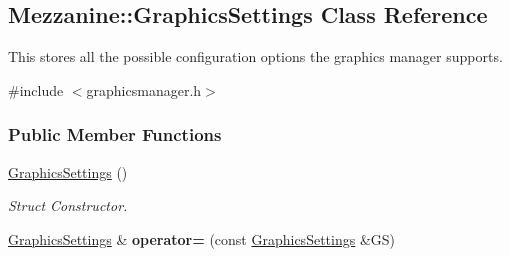 \hypertarget{structMezzanine_1_1GraphicsSettings}{
\subsection{Mezzanine::GraphicsSettings Class Reference}
\label{structMezzanine_1_1GraphicsSettings}
}


This stores all the possible configuration options the graphics manager supports.  




{\ttfamily \#include $<$graphicsmanager.h$>$}

\subsubsection*{Public Member Functions}
\begin{DoxyCompactItemize}
\item 
\hypertarget{structMezzanine_1_1GraphicsSettings_a17434ba9ce22836d37baa6f77dbe1c85}{
\hyperlink{structMezzanine_1_1GraphicsSettings_a17434ba9ce22836d37baa6f77dbe1c85}{GraphicsSettings} ()}
\label{structMezzanine_1_1GraphicsSettings_a17434ba9ce22836d37baa6f77dbe1c85}

\begin{DoxyCompactList}\small\item\em Struct Constructor. \item\end{DoxyCompactList}\item 
\hypertarget{structMezzanine_1_1GraphicsSettings_a0efa51880dd605358bcf0c2f2b9ff360}{
\hyperlink{structMezzanine_1_1GraphicsSettings}{GraphicsSettings} \& {\bfseries operator=} (const \hyperlink{structMezzanine_1_1GraphicsSettings}{GraphicsSettings} \&GS)}
\label{structMezzanine_1_1GraphicsSettings_a0efa51880dd605358bcf0c2f2b9ff360}

\end{DoxyCompactItemize}
